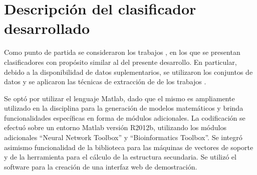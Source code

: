 %
%
%
%
\setcounter{chapter}{2}
%
\chapter{Descripción del clasificador desarrollado}
%
%
Como punto de partida se consideraron los trabajos
\cite{xue,ng,batuwita,sheng,sewer,ding}, en los que se presentan
clasificadores con propósito similar al del presente desarrollo.
En particular, debido a la disponibilidad de datos suplementarios, se
utilizaron los conjuntos de datos y se aplicaron las técnicas de
extracción de  de los trabajos \cite{xue,ng,batuwita}.

Se optó por utilizar el lenguaje Matlab, dado que el mismo es
ampliamente utilizado en la disciplina para la generación de modelos
matemáticos y brinda funcionalidades específicas en forma de módulos
adicionales.
La codificación se efectuó sobre un entorno Matlab versión R2012b,
utilizando los módulos adicionales ``Neural Network Toolbox'' y
``Bioinformatics Toolbox''.
Se integró asimismo funcionalidad de la biblioteca 
\cite{libsvm} para las máquinas de vectores de soporte y de la
herramienta  \cite{vienna} para el cálculo de la
estructura secundaria.
Se utilizó el software \work\webdemo{} \cite{webdemobuilder} para
la creación de una interfaz web de demostración.
